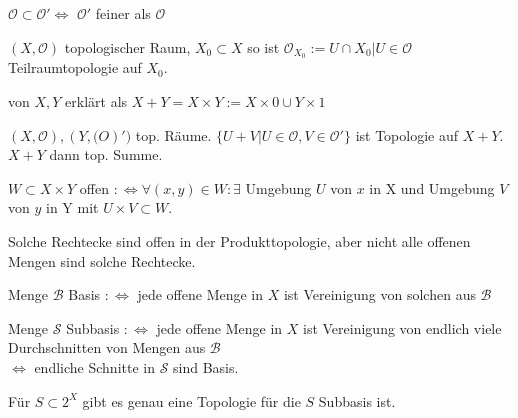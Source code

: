\begin{defi}
  $\mathcal{O} \subset \mathcal{O}' \Leftrightarrow$
  $\mathcal{O}'$ feiner als $\mathcal{O}$
\end{defi}

\begin{defi}[Teilraumtopologie]
  $(X,\mathcal{O})$ topologischer Raum, $X_0\subset X$ so ist 
  $\mathcal{O}_{X_0}:={U\cap X_0 | U\in\mathcal{O}}$ Teilraumtopologie auf $X_0$.
\end{defi}

\begin{defi}
  von $X, Y$ erklärt als
  $X+Y = X\times Y:= X\times {0} \cup Y\times {1}$
\end{defi}

\begin{defi}
  $(X,\mathcal{O}), (Y,\mathcal(O)')$ top. Räume.
  $\{U+V | U \in \mathcal{O}, V \in \mathcal{O}'\}$
  ist Topologie auf $X+Y$. $X+Y$ dann top. Summe.
\end{defi}

\begin{defi}[Produkttopologie]
  $W \subset X\times Y$ offen
  $:\Leftrightarrow \forall (x,y) \in W: \exists$
  Umgebung $U$ von $x$ in X und Umgebung $V$ von $y$ in Y
  mit $U \times V \subset W$.
\end{defi}

\begin{bem}
  Solche \glqq Rechtecke\grqq{} sind offen in der Produkttopologie,
  aber nicht alle offenen Mengen sind solche Rechtecke.
\end{bem}

\begin{defi}[Basis]
  Menge $\mathcal{B}$ Basis $:\Leftrightarrow$ jede offene Menge
  in $X$ ist Vereinigung von solchen aus $\mathcal{B}$
\end{defi}

\begin{defi}[Subbasis]
  Menge $\mathcal{S}$ Subbasis $:\Leftrightarrow$ jede offene Menge
  in $X$ ist Vereinigung von endlich viele Durchschnitten
  von Mengen aus $\mathcal{B}$\\
  $\Leftrightarrow$ endliche Schnitte in $\mathcal{S}$ sind Basis.
\end{defi}

\begin{bem}
  Für $S \subset 2^X$ gibt es genau eine Topologie für die $S$ Subbasis ist.
\end{bem}

